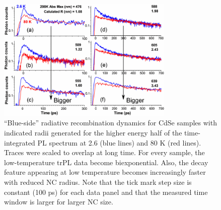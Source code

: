 \begin{figure}
\begin{center}
\includegraphics[width=0.75\textwidth]{./Chapter4/trpl2.png}
\caption[High-energy PL decay dynamics for various sizes of CdSe NC at 3K and 80K.]{“Blue-side” radiative recombination dynamics for CdSe samples with indicated radii generated for the higher energy half of the time-integrated PL spectrum at 2.6 (blue lines) and 80 K (red lines). Traces were scaled to overlap at long time. For every sample, the low-temperature trPL data become biexponential. Also, the decay feature appearing at low temperature becomes increasingly faster with reduced NC radius. Note that the tick mark step size is constant (100 ps) for each data panel and that the measured time window is larger for larger NC size.}
\label{f:trpl2}
\end{center}
\end{figure}

